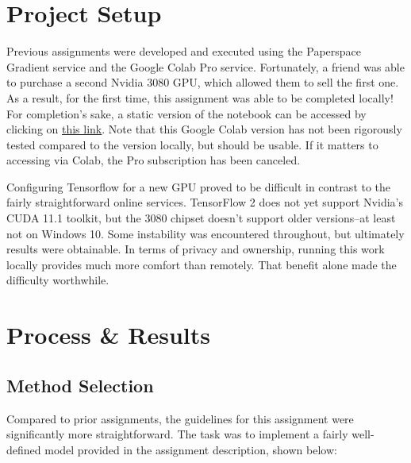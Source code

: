 \documentclass{article}
\begin{document}
  
  \graphicspath{{./images/}}

\section{Project Setup}
\par Previous assignments were developed and executed using the Paperspace Gradient service and the Google Colab Pro service.
Fortunately, a friend was able to purchase a second Nvidia 3080 GPU, which allowed them to sell the first one.
As a result, for the first time, this assignment was able to be completed locally!
For completion's sake, a static version of the notebook can be accessed by clicking on \href{https://colab.research.google.com/drive/1n1hkj_QQKMsCFOVJqnuoxGV5d7_qWw7-?usp=sharing}{this link}.
Note that this Google Colab version has not been rigorously tested compared to the version locally, but should be usable.
If it matters to accessing via Colab, the Pro subscription has been canceled.

\par Configuring Tensorflow for a new GPU proved to be difficult in contrast to the fairly straightforward online services. 
TensorFlow 2 does not yet support Nvidia's CUDA 11.1 toolkit, but the 3080 chipset doesn't support older versions--at least not on Windows 10.
Some instability was encountered throughout, but ultimately results were obtainable.
In terms of privacy and ownership, running this work locally provides much more comfort than remotely.
That benefit alone made the difficulty worthwhile.

\section{Process \& Results}
\subsection{Method Selection}
Compared to prior assignments, the guidelines for this assignment were significantly more straightforward.
The task was to implement a fairly well-defined model provided in the assignment description, shown below:
\end{document}
